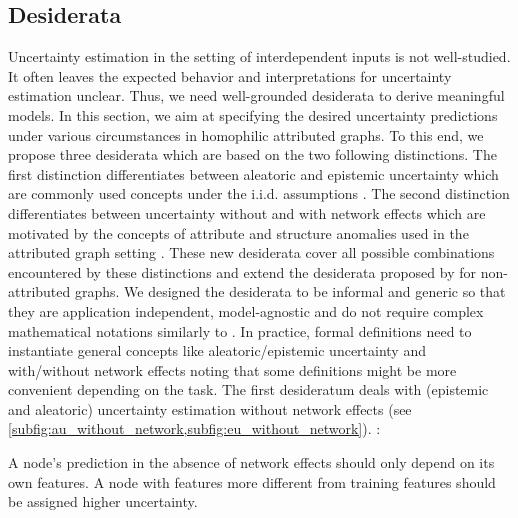 \subsection{Desiderata}
\label{sec:axioms_009}

Uncertainty estimation in the setting of interdependent inputs is not well-studied. It often leaves the expected behavior and interpretations for uncertainty estimation unclear. Thus, we need well-grounded desiderata to derive meaningful models. In this section, we aim at specifying the desired uncertainty predictions under various circumstances in homophilic attributed graphs. To this end, we propose three desiderata which are based on the two following distinctions. The first distinction differentiates between aleatoric and epistemic uncertainty which are commonly used concepts under the i.i.d. assumptions \cite{dropout, Malinin2017}. The second distinction differentiates between uncertainty without and with network effects which are motivated by the concepts of attribute and structure anomalies used in the attributed graph setting \cite{Bojchevski2018a}. These new desiderata cover all possible combinations encountered by these distinctions and extend the desiderata proposed by \citep{Eswaran2017} for non-attributed graphs. We designed the desiderata to be informal and generic so that they are application independent, model-agnostic and do not require complex mathematical notations similarly to \citep{Eswaran2017, graph-transduction-confidence}. In practice, formal definitions need to instantiate general concepts like aleatoric/epistemic uncertainty and with/without network effects noting that some definitions might be more convenient depending on the task. 
The first desideratum deals with (epistemic and aleatoric) uncertainty estimation without network effects (see \cref{subfig:au_without_network,subfig:eu_without_network}). :
\begin{desiderata}
    \label{ax:certainty_features}
    A node's prediction in the absence of network effects should only depend on its own features. A node with features more different from training features should be assigned higher uncertainty.
\end{desiderata}
